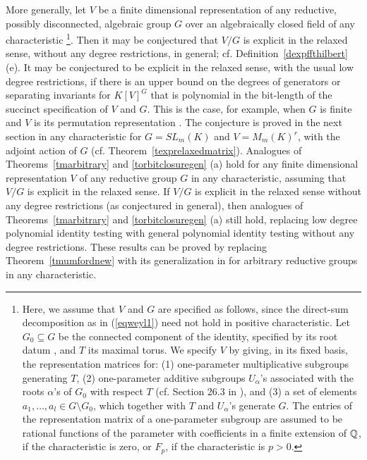 \documentclass[11pt]{article}
\begin{document}
More generally, let $V$ be a finite dimensional representation
of any  reductive, possibly disconnected, algebraic group $G$ over an algebraically closed field 
of any characteristic \footnote{Here, we assume that $V$ and $G$ are specified as follows, since the direct-sum decomposition as in 
(\ref{eqweyl1}) need not hold
in positive characteristic.
Let $G_0 \subseteq G$ be the connected component of the identity, specified by its 
root datum \cite{humphreys,milne}, and $T$ its maximal torus.
We specify $V$ by 
giving, in its fixed basis, the representation matrices for: (1)  one-parameter multiplicative 
subgroups  generating $T$, (2) one-parameter additive  subgroups $U_\alpha$'s 
associated  with the roots $\alpha$'s of $G_0$ with respect $T$ 
(cf. Section 26.3  in \cite{humphreys}), and (3) 
a set of elements $a_1,\ldots,a_l \in G \setminus G_0$, which together with 
$T$ and  $U_\alpha$'s generate $G$. The entries of the representation
matrix of a one-parameter subgroup are assumed to be rational functions of the 
parameter with coefficients in a finite extension of $\mathbb{Q}$,
if the characteristic is zero, or $F_p$, if the characteristic  is $p>0$.}.
Then  it may be conjectured that $V/G$ is explicit in the relaxed sense, without any degree restrictions, in general; cf. Definition~\ref{dexpffthilbert} (e). 
It  may be conjectured to be explicit in the relaxed sense,
with the usual low degree restrictions, 
if there is an  upper bound on the degrees
of generators or separating invariants for $K[V]^G$ that is polynomial in the bit-length of the succinct specification of
$V$ and $G$. This  is the case, for example,  when $G$ is finite and
$V$ is its permutation representation \cite{goebel}.
The conjecture is proved  in the next section  in any characteristic 
for $G=SL_m(K)$ and $V=M_{m}(K)^r$, with the adjoint action of $G$ 
 (cf. Theorem~\ref{texprelaxedmatrix}). 
Analogues of Theorems~\ref{tmarbitrary} and \ref{torbitclosuregen}  (a) hold for any finite dimensional representation $V$ of
any reductive group $G$ in any characteristic,  assuming that  $V/G$ is explicit in the relaxed sense. 
If  $V/G$ is explicit in the relaxed sense without any degree restrictions (as conjectured in general), 
then analogues of Theorems~\ref{tmarbitrary} and  \ref{torbitclosuregen}  (a) still hold, 
replacing low degree polynomial identity testing with
general polynomial identity testing without any degree restrictions.
These results can be proved by replacing  Theorem~\ref{tmumfordnew} with its generalization in
 \cite{mumford}
for arbitrary reductive groups in any characteristic.
\end{document}
